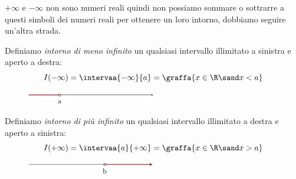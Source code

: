\(+\infty\) e \(-\infty\) non sono numeri reali quindi non possiamo sommare 
o sottrarre a questi simboli dei numeri reali per ottenere un loro intorno, 
dobbiamo seguire un'altra strada.


\begin{newdef}{}{}
Definiamo \emph{intorno di meno infinito} un qualsiasi intervallo illimitato a 
sinistra e aperto a destra:
\[I(-\infty) = \intervaa{-\infty}{a} = \graffa{x \in \R \sand x < a}\]
\end{newdef}

\begin{figure}[h!]
  \centering
  \includegraphics[width=0.5\textwidth]{img/top_4.png}%
\end{figure}


\begin{newdef}{}{}
Definiamo \emph{intorno di più infinito} un qualsiasi intervallo illimitato a 
destra e aperto a sinistra:
\[I(+\infty) = \intervaa{a}{+\infty} = \graffa{x \in \R \sand x > a}\]
\end{newdef}

\begin{figure}[h!]
\centering
\includegraphics[width=0.5\textwidth]{img/top_5.png}%
\end{figure}

% 


